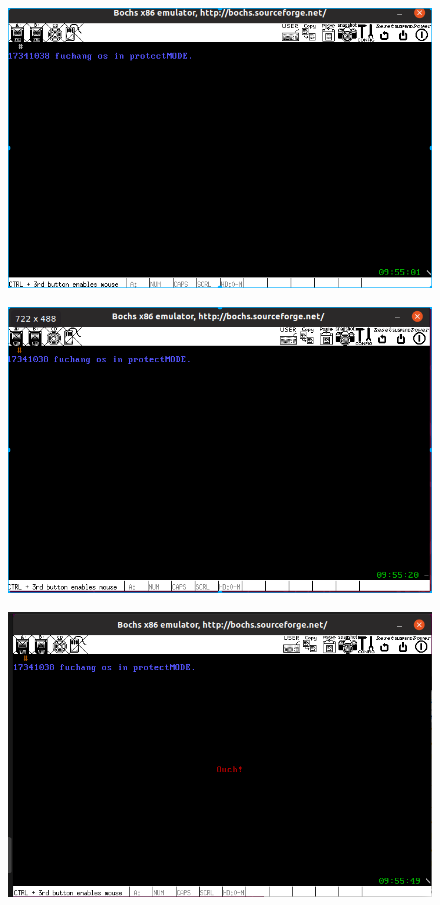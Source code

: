 \documentclass[a4paper,11pt,UTF8]{ctexart}
\newcommand{\bottomcaption}{%
\setlength{\abovecaptionskip}{6pt}%
\setlength{\belowcaptionskip}{6pt}%
\caption}
\begin{document}
	\begin{figure}[htbp]
		\centering
		\includegraphics[width=15cm]{expr_image/DeepinScrot-5338.png}
		\bottomcaption{}
	\end{figure}
	
	\begin{figure}[htbp]
		\centering
		\includegraphics[width=15cm]{expr_image/DeepinScrot-5455.png}
		\bottomcaption{}
	\end{figure}

	\begin{figure}[htbp]
		\centering
		\includegraphics[width=15cm]{expr_image/4.png}
		\bottomcaption{}
	\end{figure}
	
\end{document}
